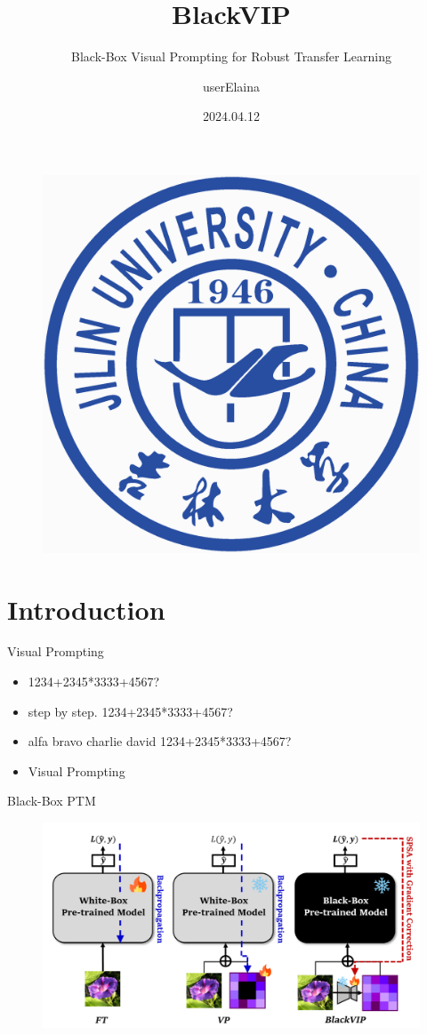 \documentclass{beamer}
\author{userElaina}
\title{BlackVIP
}
\subtitle{Black-Box Visual Prompting for Robust Transfer Learning}
\institute{JLU-SAI}
\date{2024.04.12}
\begin{document}
\kaishu
\begin{frame}
    \titlepage
    \begin{figure}[htpb]
        \begin{center}
            \includegraphics[width=0.15\linewidth]{pic/Jilin_University_Logo.eps}
        \end{center}
    \end{figure}
\end{frame}

\begin{frame}
\tableofcontents[sectionstyle=show,subsectionstyle=show/shaded/hide,subsubsectionstyle=show/shaded/hide]
\end{frame}

\section{Introduction}

\begin{frame}{Visual Prompting}
    \begin{itemize}[<+-| alert@+>]
        \item 1234+2345*3333+4567?
        \item step by step. 1234+2345*3333+4567?
        \item alfa bravo charlie david 1234+2345*3333+4567?
        \item Visual Prompting
    \end{itemize}
\end{frame}

\begin{frame}{Black-Box PTM}
    \begin{figure}[l]
        \centering
        \includegraphics[width=\textwidth]{pic/1.png}
    \end{figure}
\end{frame}
\end{document}
